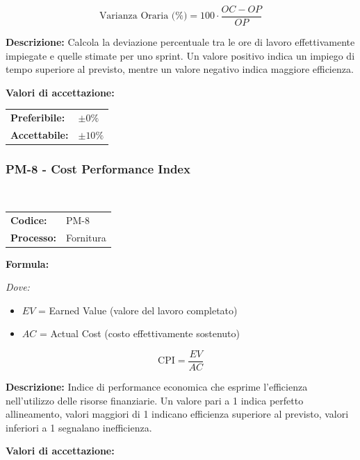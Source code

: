 \documentclass[a4paper,11pt,oneside]{scrartcl}
\begin{document}
\[
\text{Varianza Oraria (\%)} = 100 \cdot \frac{OC - OP}{OP}
\]

\noindent\textbf{Descrizione:} Calcola la deviazione percentuale tra le ore di lavoro effettivamente impiegate e quelle stimate per uno sprint. Un valore positivo indica un impiego di tempo superiore al previsto, mentre un valore negativo indica maggiore efficienza.

\vspace{0.2cm}
\noindent\textbf{Valori di accettazione:}
\vspace{0.1cm}

\noindent
\begin{tabular}{@{}ll@{}}
\textbf{Preferibile:} & $\pm 0\%$ \\
\textbf{Accettabile:} & $\pm 10\%$ \\
\end{tabular}

\subsubsection{PM-8 - Cost Performance Index}
 
\noindent
\begin{tabular}{@{}p{}p{}@{}}
\textbf{Codice:} & PM-8 \\
\textbf{Processo:} & Fornitura \\
\end{tabular}

\vspace{0.3cm}
\noindent\textbf{Formula:}

\noindent\textit{Dove:}
\begin{itemize}[leftmargin=1.5cm, topsep=0pt, itemsep=0pt]
    \item $EV$ = Earned Value (valore del lavoro completato)
    \item $AC$ = Actual Cost (costo effettivamente sostenuto)
\end{itemize}

\[
\text{CPI} = \frac{EV}{AC}
\]

\noindent\textbf{Descrizione:} Indice di performance economica che esprime l'efficienza nell'utilizzo delle risorse finanziarie. Un valore pari a 1 indica perfetto allineamento, valori maggiori di 1 indicano efficienza superiore al previsto, valori inferiori a 1 segnalano inefficienza.

\vspace{0.2cm}
\noindent\textbf{Valori di accettazione:}
\vspace{0.1cm}
\end{document}
